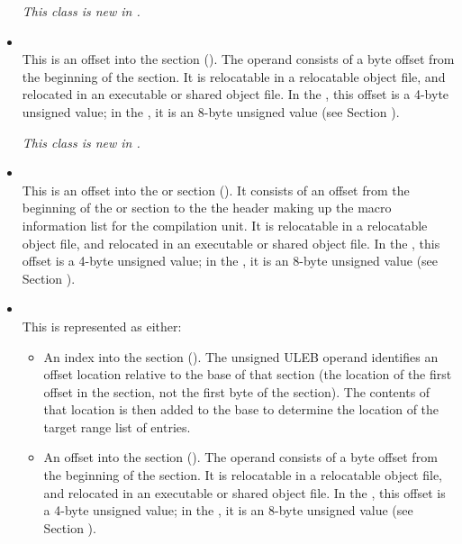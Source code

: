 \begin{itemize}
\textit{This class is new in \DWARFVersionV.}

\item \CLASSloclistsptr \\
This is an offset into the \dotdebugloclists{} section (\DWFORMsecoffset). 
The operand consists of a byte 
offset
from the beginning of the \dotdebugloclists{} section.
It is relocatable in a relocatable object file, and
relocated in an executable or shared object file. In the 
\thirtytwobitdwarfformat, this offset is a 4-byte unsigned value;
in the \sixtyfourbitdwarfformat, it is an 8-byte unsigned value
(see Section ).

\textit{This class is new in \DWARFVersionV.}

\item \CLASSmacptr \\
This is an 
offset into the 
\dotdebugmacro{} or \dotdebugmacrodwo{} section
(\DWFORMsecoffset). 
It consists of an offset from the beginning of the 
\dotdebugmacro{} or \dotdebugmacrodwo{} 
section to the the header making up the 
macro information list for the compilation unit. 
It is relocatable in a relocatable object file, and
relocated in an executable or shared object file. In the 
\thirtytwobitdwarfformat, this offset is a 4-byte unsigned value;
in the \sixtyfourbitdwarfformat, it is an 8-byte unsigned value
(see Section ).

\item \CLASSrnglist \\
This is represented as either:
\begin{itemize}
\item
An index into the \dotdebugrnglists{} section (\DWFORMrnglistxTARG). 
The unsigned ULEB operand identifies an offset location 
relative to the base of that section (the location of the first offset 
in the section, not the first byte of the section). The contents of 
that location is then added to the base to determine the location of 
the target range list of entries.
\item
\bb
An offset into the \dotdebugrnglists{} section (\DWFORMsecoffset). 
The operand consists of a byte 
offset
\eb
from the beginning of the \dotdebugrnglists{} section.
It is relocatable in a relocatable object file, and
relocated in an executable or shared object file. In the 
\thirtytwobitdwarfformat, this offset is a 4-byte unsigned value;
in the \sixtyfourbitdwarfformat, it is an 8-byte unsigned value
(see Section ).
\end{itemize}


\end{itemize}
